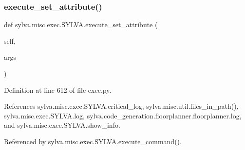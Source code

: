 \subsubsection{\texorpdfstring{execute\+\_\+set\+\_\+attribute()}{execute\_set\_attribute()}}
{\footnotesize\ttfamily def sylva.\+misc.\+exec.\+S\+Y\+L\+V\+A.\+execute\+\_\+set\+\_\+attribute (\begin{DoxyParamCaption}\item[{}]{self,  }\item[{}]{args }\end{DoxyParamCaption})}



Definition at line 612 of file exec.\+py.



References sylva.\+misc.\+exec.\+S\+Y\+L\+V\+A.\+critical\+\_\+log, sylva.\+misc.\+util.\+files\+\_\+in\+\_\+path(), sylva.\+misc.\+exec.\+S\+Y\+L\+V\+A.\+log, sylva.\+code\+\_\+generation.\+floorplanner.\+floorplanner.\+log, and sylva.\+misc.\+exec.\+S\+Y\+L\+V\+A.\+show\+\_\+info.



Referenced by sylva.\+misc.\+exec.\+S\+Y\+L\+V\+A.\+execute\+\_\+command().


